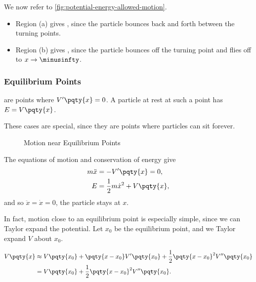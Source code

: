 We now refer to \autoref{fig:potential-energy-allowed-motion}.

\begin{definition}
    \label{def:bounded-unbounded-motion}%
    \begin{itemize}
        \item Region (a) gives , since the particle bounces back and forth between the turning points.
        \item Region (b) gives , since the particle bounces off the turning point and flies off to \(x \to \minusinfty\).
    \end{itemize}
\end{definition}

\subsubsection{Equilibrium Points}

\begin{definition}
    \label{def:equilibrium-points}%
     are points where \(V'\pqty{x} = 0\). A particle at rest at such a point has \(E = V\pqty{x}\).
\end{definition}

These cases are special, since they are points where particles can sit forever.

\begin{figure}[ht!]
    \centering

    \caption{Motion near Equilibrium Points}
    \label{fig:motion-near-equilibrium-points}%
\end{figure}

The equations of motion and conservation of energy give
\begin{subequations}\begin{align}
    m \ddot{x} &= - V'\pqty{x} = 0, \\
    E &= \frac{1}{2} m \dot{x}^2 + V\pqty{x},
\end{align}\end{subequations}
and so \(\ddot{x} = \dot{x} = 0\), the particle stays at \(x\).

In fact, motion close to an equilibrium point is especially simple, since we can Taylor expand the potential. Let \(x_0\) be the equilibrium point, and we Taylor expand \(V\) about \(x_0\).

\begin{subequations}\begin{align}
    V\pqty{x} &\approx V\pqty{x_0} + \pqty{x - x_0} V' \pqty{x_0} + \frac{1}{2} \pqty{x - x_0}^2 V''\pqty{x_0} \\
    &= V\pqty{x_0} + \frac{1}{2} \pqty{x - x_0}^2 V''\pqty{x_0}.
\end{align}\end{subequations}

